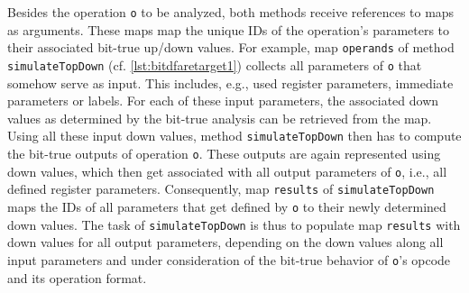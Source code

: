 Besides the operation \texttt{o} to be analyzed, both methods receive references to maps as arguments.
These maps map the unique IDs of the operation's parameters to their associated bit-true up/down values.
For example, map \texttt{operands} of method \texttt{simulateTopDown} (cf. \cref{lst:bitdfaretarget1}) collects all parameters of \texttt{o} that somehow serve as input.
This includes, e.g., used register parameters, immediate parameters or labels.
For each of these input parameters, the associated down values as determined by the bit-true analysis can be retrieved from the map.
Using all these input down values, method \texttt{simulateTopDown} then has to compute the bit-true outputs of operation \texttt{o}.
These outputs are again represented using down values, which then get associated with all output parameters of \texttt{o}, i.e., all defined register parameters.
Consequently, map \texttt{results} of \texttt{simulateTopDown} maps the IDs of all parameters that get defined by \texttt{o} to their newly determined down values.
The task of \texttt{simulateTopDown} is thus to populate map \texttt{results} with down values for all output parameters, depending on the down values along all input parameters and under consideration of the bit-true behavior of \texttt{o}'s opcode and its operation format.


